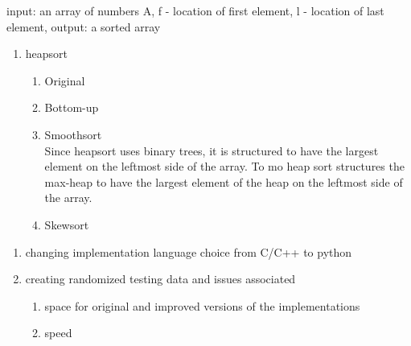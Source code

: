\documentclass{IEEEtran}
\begin{document}
\begin{algorithm}[h!]
    \begin{algorithmic}[1]
         {input:  an array of numbers A, f - location of first element, l - location of last element, output: a sorted array}

                \EndWhile

                \EndWhile

                \Else
                \EndIf
            \EndWhile

            \State{} 

        \EndFunction{}
    \end{algorithmic}
\end{algorithm}

\begin{enumerate}
\item heapsort

\begin{enumerate}
\item Original 
\item Bottom-up
\item Smoothsort\\
Since heapsort uses binary trees, it is structured to have the largest element on the leftmost side of the array.  To mo
heap sort structures the max-heap to have the largest element of the heap on the leftmost side of the array.
\item Skewsort
\end{enumerate}

\end{enumerate}




\begin{enumerate}
\item changing implementation language choice from C/C++ to python
\item creating randomized testing data and issues associated
\begin{enumerate}
\item space for original and improved versions of the implementations
\item speed
\end{enumerate}
\end{enumerate}
\end{document}

